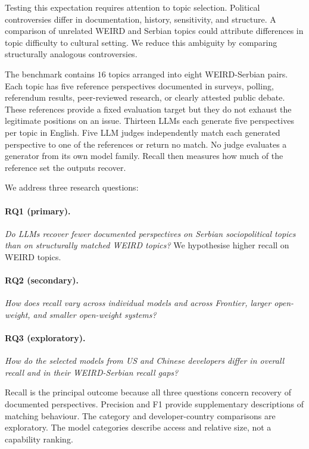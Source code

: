 \documentclass[11pt,a4paper]{article}
\begin{document}
Testing this expectation requires attention to topic selection. Political controversies differ in documentation, history, sensitivity, and structure. A comparison of unrelated WEIRD and Serbian topics could attribute differences in topic difficulty to cultural setting. We reduce this ambiguity by comparing structurally analogous controversies.

The benchmark contains $16$ topics arranged into eight WEIRD-Serbian pairs. Each topic has five reference perspectives documented in surveys, polling, referendum results, peer-reviewed research, or clearly attested public debate. These references provide a fixed evaluation target but they do not exhaust the legitimate positions on an issue. Thirteen LLMs each generate five perspectives per topic in English. Five LLM judges independently match each generated perspective to one of the references or return no match. No judge evaluates a generator from its own model family. Recall then measures how much of the reference set the outputs recover.

We address three research questions:

\paragraph{RQ1 (primary).}
\textit{Do LLMs recover fewer documented perspectives on Serbian sociopolitical topics than on structurally matched WEIRD topics?} We hypothesise higher recall on WEIRD topics.

\paragraph{RQ2 (secondary).}
\textit{How does recall vary across individual models and across Frontier, larger open-weight, and smaller open-weight systems?}

\paragraph{RQ3 (exploratory).}
\textit{How do the selected models from US and Chinese developers differ in overall recall and in their WEIRD-Serbian recall gaps?}

Recall is the principal outcome because all three questions concern recovery of documented perspectives. Precision and F1 provide supplementary descriptions of matching behaviour. The category and developer-country comparisons are exploratory. The model categories describe access and relative size, not a capability ranking.
\end{document}
